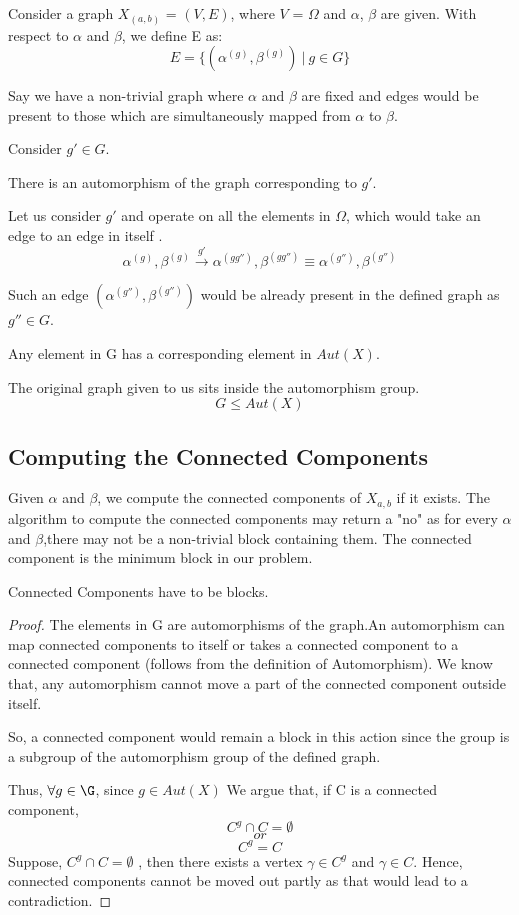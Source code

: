 Consider a graph $X_(a,b)$ = $(V,E)$, where $V$ = $\Omega$ and $\alpha$, $\beta$ are given.
With respect to $\alpha$ and $\beta$, we define E as:
\[ E = \{(\alpha^{(g)},\beta^{(g)}) ~|~ g \in G\} \]

Say we have a non-trivial graph where $\alpha$ and $\beta$ are fixed and edges would be present to those which are simultaneously mapped from $\alpha$ to $\beta$.

Consider $g'\in G$.
\begin{claim}
There is an automorphism of the graph corresponding to $g'$. 
\end{claim}
Let us consider $g'$ and operate on all the elements in $\Omega$, which would take an edge to an edge in itself .
\[ \alpha^{(g)},\beta^{(g)}  \xrightarrow{g'}  \alpha^{(gg'')},\beta^{(gg'')}\equiv \alpha^{(g'')},\beta^{(g'')}\]


Such an edge $(\alpha^{(g'')},\beta^{(g'')})$ would be already present in the defined graph as $g''\in G$.

\begin{observation}
Any element in G has a corresponding element in $Aut(X)$.
\end{observation}
The original graph given to us sits inside the automorphism group.
\[G \leq Aut(X)\]

\subsection{Computing the Connected Components}

Given $\alpha$ and $\beta$, we compute the connected components of $X_{a,b}$ if it exists.
The algorithm to compute the connected components may return a "no" as for every $\alpha$ and $\beta$,there may not be a non-trivial block containing them.
The connected component is the minimum block in our problem.

\begin{claim}
Connected Components have to be blocks.
\end{claim}
\begin{proof}
The elements in G are automorphisms of the graph.An automorphism can map connected components to itself or takes a connected component to a connected component (follows from the definition of Automorphism). We know that, any automorphism cannot move a part of the connected component outside itself.

So, a connected component would remain a block in this action since the group is a subgroup of the automorphism group of the defined graph.


Thus, $\forall g \in \G$, since $g \in Aut(X)$
We argue that, if C is a connected component,
  \[C^g \cap C = \emptyset\]
  \[ or\]
  \[ C^g = C\]
  Suppose, $C^g \cap C = \emptyset$ , then there exists a vertex $\gamma \in C^g$ and $\gamma \in C$.
  Hence, connected components cannot be moved out partly as that would lead to a contradiction.
\end{proof}

